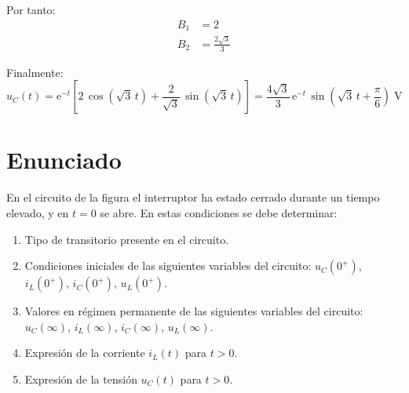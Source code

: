 Por tanto:
\begin{align*}
  B_1 &= 2\\
  B_2 &= \frac{2\sqrt{3}}{3}
\end{align*}

Finalmente:
\begin{equation*}
u_C(t)= \mathrm{e}^{-t}\left[2\,\cos(\sqrt{3}\,t)+\dfrac{2}{\sqrt{3}}\,\sin(\sqrt{3}\,t)\right]=\dfrac{4\sqrt{3}}{3}\,\mathrm{e}^{-t}\,\sin\left(\sqrt{3}\,t+\dfrac{\pi}{6}\right) \;\si{\volt}
\end{equation*}


\section{Enunciado}
En el circuito de la figura el interruptor ha estado cerrado durante un tiempo elevado, y en $t = 0$ se abre. En estas condiciones se debe determinar:

\begin{enumerate}
\item Tipo de transitorio presente en el circuito.

\item Condiciones iniciales de las siguientes variables del circuito: $u_C(0^+)$, $i_L(0^+)$, $i_C(0^+)$, $u_L(0^+)$.
\item Valores en régimen permanente de las siguientes variables del circuito: $u_C(\infty)$, $i_L(\infty)$, $i_C(\infty)$, $u_L(\infty)$.
\item Expresión de la corriente $i_L(t)$ para  $t > 0$.
\item Expresión de la tensión $u_C(t)$ para  $t > 0$.
\end{enumerate}


